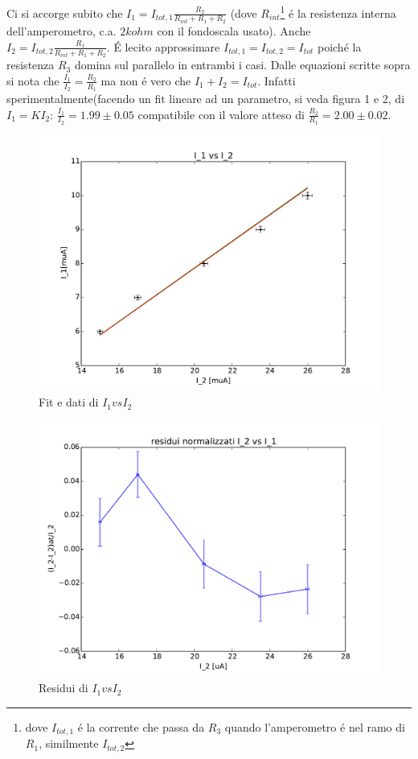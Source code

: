 \documentclass[10pt,a4paper]{article}
\begin{document}
Ci si accorge subito che $I_1=I_{tot,1}\frac{R_2}{R_{int}+R_1+R_2}$ (dove $R_{int}$\footnote{dove $I_{tot, 1}$ \'e la corrente che passa da $R_3$ quando l'amperometro \'e nel ramo di $R_1$, similmente $I_{tot, 2}$ } \'e la resistenza interna dell'amperometro, c.a. $2 kohm$ con il fondoscala usato). Anche $I_2=I_{tot,2}\frac{R_1}{R_{int}+R_1+R_2}$. \'E lecito approssimare $I_{tot, 1}=I_{tot, 2}=I_{tot}$ poich\'e la resistenza $R_3$ domina sul parallelo in entrambi i casi.
Dalle equazioni scritte sopra si nota che $\frac{I_1}{I_2}=\frac{R_2}{R_1}$ ma non \'e vero che $I_1+I_2=I_{tot}$. Infatti sperimentalmente(facendo un fit lineare ad un parametro, si veda figura 1 e 2, di $I_1=K I_2$:
$\frac{I_1}{I_2}=1.99 \pm 0.05$
compatibile con il valore atteso di $\frac{R_2}{R_1}=2.00 \pm 0.02$.
\begin{figure}
\centering
\includegraphics{./immagini/fig2e.pdf}
\caption{Fit e dati di $I_1 vs I_2$}
\end{figure}
\begin{figure}
\centering
\includegraphics{./immagini/fig2eres.pdf}
\caption{Residui di $I_1 vs I_2$}
\end{figure}
\end{document}
